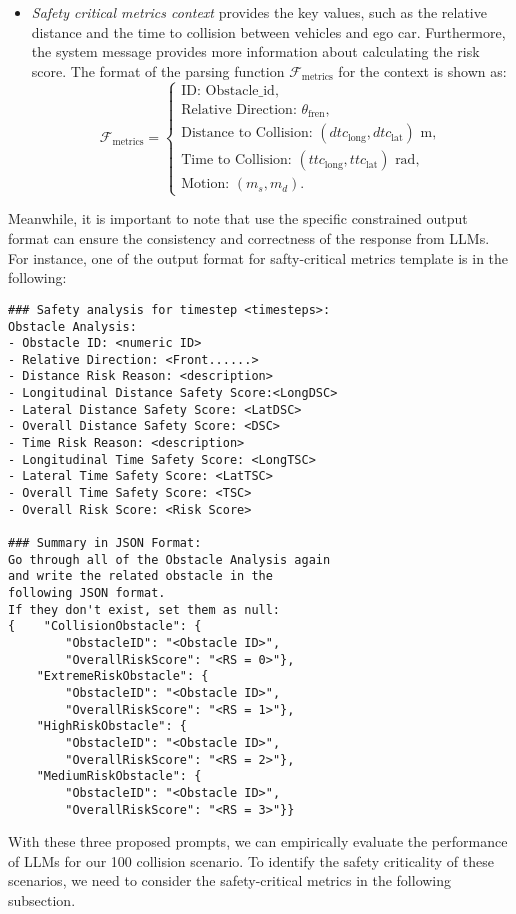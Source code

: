 \begin{itemize}
    \item \textit{Safety critical metrics context} provides the key values, such as the relative distance and the time to collision between vehicles and ego car. Furthermore, the system message provides more information about calculating the risk score. The format of the parsing function $\mathcal{F}_{\text{metrics}}$ for the context is shown as:
{\small
    \[
    \mathcal{F}_{\text{metrics}} =
    \begin{cases}
    \text{ID: } \text{Obstacle\_id}, \\
    \text{Relative Direction: } \theta_{\text{fren}}, \\
    \text{Distance to Collision: } (dtc_{\text{long}},  dtc_{\text{lat}}) \text{ m}, \\
    \text{Time to Collision: } (ttc_{\text{long}}, ttc_{\text{lat}}) \text{ rad},\\
    \text{Motion: } (m_s, m_d).
    \end{cases}
\]
}
\end{itemize}
Meanwhile, it is important to note that use the specific constrained output format can ensure the consistency and correctness of the response from LLMs. For instance, one of the output format for safty-critical metrics template is in the following:

{\small
\begin{verbatim}
### Safety analysis for timestep <timesteps>: 
Obstacle Analysis:
- Obstacle ID: <numeric ID>
- Relative Direction: <Front......>
- Distance Risk Reason: <description>
- Longitudinal Distance Safety Score:<LongDSC>  
- Lateral Distance Safety Score: <LatDSC>
- Overall Distance Safety Score: <DSC>
- Time Risk Reason: <description>
- Longitudinal Time Safety Score: <LongTSC>
- Lateral Time Safety Score: <LatTSC>
- Overall Time Safety Score: <TSC>
- Overall Risk Score: <Risk Score>

### Summary in JSON Format:
Go through all of the Obstacle Analysis again
and write the related obstacle in the 
following JSON format. 
If they don't exist, set them as null:  
{    "CollisionObstacle": {
        "ObstacleID": "<Obstacle ID>",
        "OverallRiskScore": "<RS = 0>"},
    "ExtremeRiskObstacle": {
        "ObstacleID": "<Obstacle ID>",
        "OverallRiskScore": "<RS = 1>"},
    "HighRiskObstacle": {
        "ObstacleID": "<Obstacle ID>",
        "OverallRiskScore": "<RS = 2>"},
    "MediumRiskObstacle": {
        "ObstacleID": "<Obstacle ID>",
        "OverallRiskScore": "<RS = 3>"}}
\end{verbatim}
}
With these three proposed prompts, we can empirically evaluate the performance of LLMs for our 100 collision scenario. To identify the safety criticality of these scenarios, we need to consider the safety-critical metrics in the following subsection.


